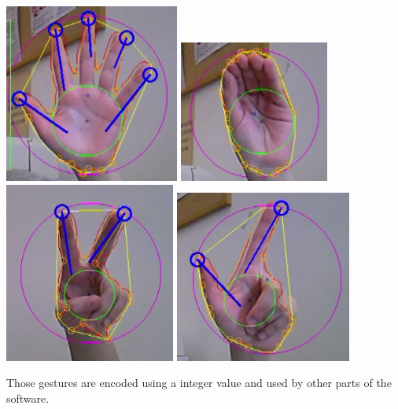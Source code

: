 \hspace{-1.6cm}
\includegraphics[scale=0.65]{images/5fingers_cropped.png} 
\includegraphics[scale=0.82]{images/click_cropped.png} 
\includegraphics[scale=0.65]{images/victory_cropped.png}
\includegraphics[scale=0.68]
{images/Lgesture_cropped.png} 

Those gestures are encoded using a integer value and used by other parts of the software.


